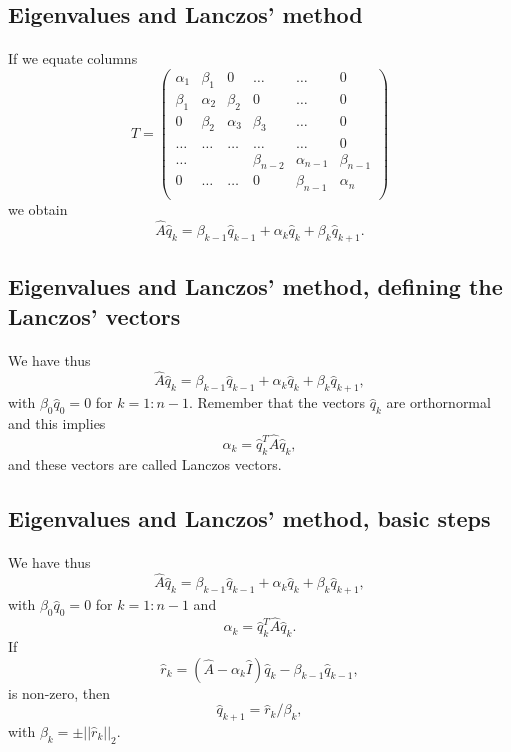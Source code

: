 \subsection*{Eigenvalues and Lanczos' method}

\paragraph{}
If we equate columns 
\[
\hat{T} = \left(\begin{array}{cccccc}
        \alpha_1& \beta_1 & 0 &\dots   & \dots &0 \\
        \beta_1 & \alpha_2 & \beta_2 &0 &\dots &0 \\
        0& \beta_2 & \alpha_3 & \beta_3 & \dots &0 \\
        \dots& \dots   & \dots &\dots   &\dots & 0 \\
        \dots&   &  &\beta_{n-2}  &\alpha_{n-1}& \beta_{n-1} \\
        0&  \dots  &\dots  &0   &\beta_{n-1} & \alpha_{n} \\
        \end{array} \right)
\]
we obtain
\[
\hat{A}\hat{q}_k=\beta_{k-1}\hat{q}_{k-1}+\alpha_k\hat{q}_k+\beta_k\hat{q}_{k+1}.
\]



\subsection*{Eigenvalues and Lanczos' method, defining the Lanczos' vectors}

\paragraph{}
We have thus
\[
\hat{A}\hat{q}_k=\beta_{k-1}\hat{q}_{k-1}+\alpha_k\hat{q}_k+\beta_k\hat{q}_{k+1},
\]
with $\beta_0\hat{q}_0=0$ for $k=1:n-1$. Remember that the vectors $\hat{q}_k$  are orthornormal and this implies
\[
\alpha_k=\hat{q}_k^T\hat{A}\hat{q}_k,
\]
and these vectors are called Lanczos vectors.



\subsection*{Eigenvalues and Lanczos' method, basic steps}

\paragraph{}
We have thus
\[
\hat{A}\hat{q}_k=\beta_{k-1}\hat{q}_{k-1}+\alpha_k\hat{q}_k+\beta_k\hat{q}_{k+1},
\]
with $\beta_0\hat{q}_0=0$ for $k=1:n-1$ and 
\[
\alpha_k=\hat{q}_k^T\hat{A}\hat{q}_k.
\]
If 
\[
\hat{r}_k=(\hat{A}-\alpha_k\hat{I})\hat{q}_k-\beta_{k-1}\hat{q}_{k-1},
\]
is non-zero, then 
\[
\hat{q}_{k+1}=\hat{r}_{k}/\beta_k,
\]
with $\beta_k=\pm ||\hat{r}_{k}||_2$.

